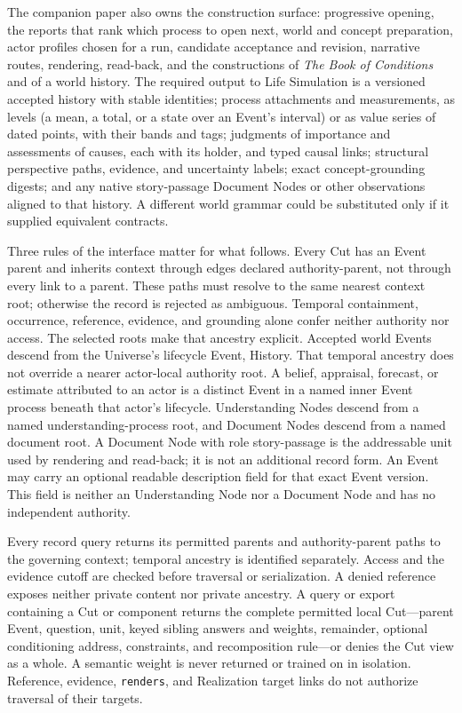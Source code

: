 \documentclass[10pt]{article}
\newcommand{\Book}{\textit{The Book of Conditions}}
\begin{document}
The companion paper also owns the construction surface: progressive opening,
the reports that rank which process to open next, world and concept
preparation, actor profiles chosen for a run, candidate acceptance and
revision, narrative routes, rendering, read-back, and the constructions of
\Book{} and of a world history. The required output to Life Simulation is a
versioned accepted history with stable identities; process attachments and measurements, as levels (a mean, a total, or a state over an
Event's interval) or as value series of dated points, with their bands and tags;
judgments of importance and
assessments of causes, each with its holder, and typed causal links; structural
perspective paths, evidence, and uncertainty labels; exact concept-grounding
digests; and any native story-passage Document Nodes or other observations
aligned to that history. A different
world grammar could be substituted only if it supplied equivalent contracts.

Three rules of the interface matter for what follows. Every Cut has an Event
parent and inherits context through edges declared \textsf{authority-parent},
not through every link to a parent. These paths must resolve to the same
nearest context root; otherwise the record is rejected as ambiguous. Temporal
containment, occurrence, reference, evidence, and grounding alone confer
neither authority nor access.
The selected roots make that ancestry explicit. Accepted world Events descend
from the Universe's lifecycle Event, History. That temporal ancestry does not
override a nearer actor-local authority root. A belief, appraisal, forecast, or
estimate attributed to an actor is a distinct Event in a named inner Event
process beneath that actor's lifecycle. Understanding Nodes descend
from a named understanding-process root, and Document Nodes descend from a
named document root. A Document Node with role \textsf{story-passage} is the
addressable unit used by rendering and read-back; it is not an additional
record form. An Event may carry an optional readable description field for that
exact Event version. This field is neither an Understanding Node nor a Document
Node and has no independent authority.

Every record query returns its permitted parents and authority-parent paths to
the governing context; temporal ancestry is identified separately. Access and
the evidence cutoff are checked before traversal or serialization. A denied
reference exposes neither private content nor private ancestry. A query or
export containing a Cut or component returns the complete permitted local
Cut---parent Event, question, unit, keyed sibling answers and weights,
remainder, optional conditioning address, constraints, and recomposition
rule---or denies the Cut view as a whole. A semantic weight is never returned
or trained on in isolation. Reference, evidence, \texttt{renders}, and
Realization target links do not authorize traversal of their targets.
\end{document}
